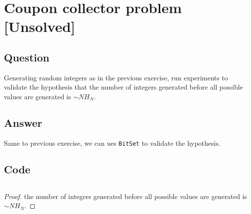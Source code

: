 \section{Coupon collector problem [Unsolved]}

\subsection*{Question}
Generating random integers as in the previous exercise,
run experiments to validate the hypothesis that the
number of integers generated before all possible values
are generated is $\sim{NH_N}$.

\subsection*{Answer}
Same to previous exercise, we can ues \texttt{BitSet} to validate the hypothesis.

\subsection*{Code}
\inputminted{java}{puzzles/coupon_collector_problem/CouponCollectorProblem.java}
\begin{proof}
    the number of integers generated before all possible values
    are generated is $\sim{NH_N}$.
\end{proof}
